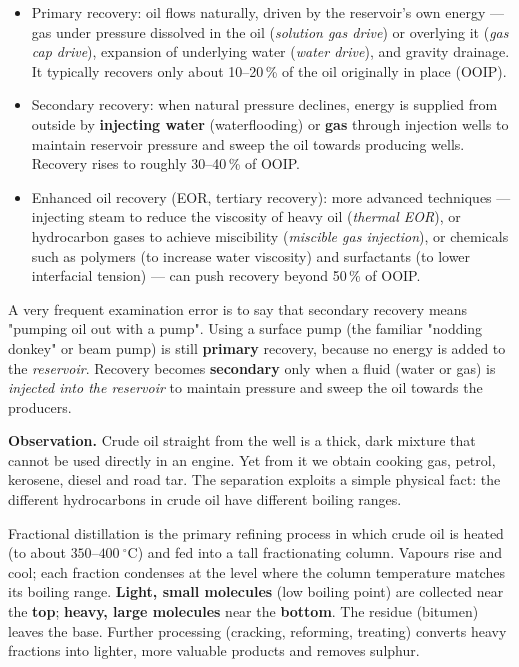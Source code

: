 \documentclass[11pt]{article}
\newcommand{\cle}[1]{{\popxbold\color{popdark}#1}}
\newcounter{popsec}
\newcounter{popsub}
\newcommand{\courssub}[1]{%
  \stepcounter{popsub}%
  \par\vspace{9pt}\noindent{\popxbold\fontsize{11.5}{13}\selectfont\color{popink}{\color{poporange}\thepopsec.\thepopsub}\hspace{6pt}#1}\par\nopagebreak\vspace{4pt}
}
\begin{document}
\begin{definition}
\begin{itemize}
\item \cle{Primary recovery}: oil flows naturally, driven by the reservoir's own energy — gas under pressure dissolved in the oil (\emph{solution gas drive}) or overlying it (\emph{gas cap drive}), expansion of underlying water (\emph{water drive}), and gravity drainage. It typically recovers only about 10--20\,\% of the oil originally in place (OOIP).
\item \cle{Secondary recovery}: when natural pressure declines, energy is supplied from outside by \textbf{injecting water} (waterflooding) or \textbf{gas} through injection wells to maintain reservoir pressure and sweep the oil towards producing wells. Recovery rises to roughly 30--40\,\% of OOIP.
\item \cle{Enhanced oil recovery} (EOR, tertiary recovery): more advanced techniques — injecting steam to reduce the viscosity of heavy oil (\emph{thermal EOR}),  or hydrocarbon gases to achieve miscibility (\emph{miscible gas injection}), or chemicals such as polymers (to increase water viscosity) and surfactants (to lower interfacial tension) — can push recovery beyond 50\,\% of OOIP.
\end{itemize}
\end{definition}

\begin{attention}
A very frequent examination error is to say that secondary recovery means "pumping oil out with a pump". Using a surface pump (the familiar "nodding donkey" or beam pump) is still \textbf{primary} recovery, because no energy is added to the \emph{reservoir}. Recovery becomes \textbf{secondary} only when a fluid (water or gas) is \emph{injected into the reservoir} to maintain pressure and sweep the oil towards the producers.
\end{attention}

\courssub{Refining: Fractional Distillation of Crude Oil}

\textbf{Observation.} Crude oil straight from the well is a thick, dark mixture that cannot be used directly in an engine. Yet from it we obtain cooking gas, petrol, kerosene, diesel and road tar. The separation exploits a simple physical fact: the different hydrocarbons in crude oil have different \cle{boiling ranges}.

\begin{definition}
\cle{Fractional distillation} is the primary refining process in which crude oil is heated (to about $350$--$400\ ^{\circ}\mathrm{C}$) and fed into a tall \cle{fractionating column}. Vapours rise and cool; each fraction condenses at the level where the column temperature matches its boiling range. \textbf{Light, small molecules} (low boiling point) are collected near the \textbf{top}; \textbf{heavy, large molecules} near the \textbf{bottom}. The residue (bitumen) leaves the base. Further processing (cracking, reforming, treating) converts heavy fractions into lighter, more valuable products and removes sulphur.
\end{definition}
\end{document}

